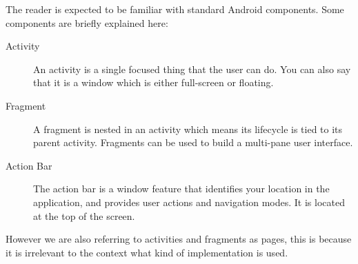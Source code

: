 
The reader is expected to be familiar with standard Android components. Some components are briefly explained here:
\begin{description}
\item[Activity] An activity is a single focused thing that the user can do. You can also say that it is a window which is either full-screen or floating. \citep{activity}
\item[Fragment] A fragment is nested in an activity which means its lifecycle is tied to its parent activity. Fragments can be used to build a multi-pane user interface. \citep{fragment}
\item[Action Bar] The action bar is a window feature that identifies your location in the application, and provides user actions and navigation modes. It is located at the top of the screen. \citep{actionbar}
\end{description}

However we are also referring to activities and fragments as pages, this is because it is irrelevant to the context what kind of implementation is used.
